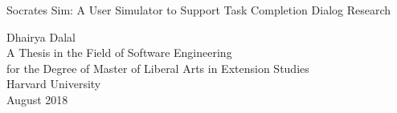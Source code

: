 
\thispagestyle{empty}
\begin{center}

  \vspace*{0.6in}
  Socrates Sim: A User Simulator to Support Task Completion Dialog Research
  
  \vspace{2.3in}
  Dhairya Dalal\\
  \vspace{1.8in}
  A Thesis in the Field of Software Engineering\\
  for the Degree of Master of Liberal Arts in Extension Studies\\
  \vspace{.8in}
  Harvard University\\

  \vfill
  August 2018
  \vspace*{.5in}
\end{center}




